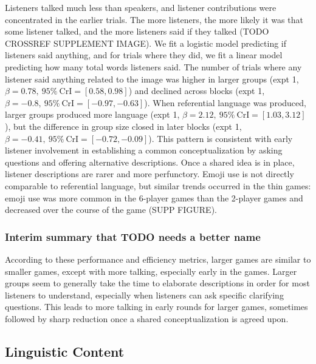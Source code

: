 \documentclass[
  english,
  a4paper,
]{article}
\begin{document}
Listeners talked much less than speakers, and listener contributions were concentrated in the earlier trials. The more listeners, the more likely it was that some listener talked, and the more listeners said if they talked (TODO CROSSREF SUPPLEMENT IMAGE). We fit a logistic model predicting if listeners said anything, and for trials where they did, we fit a linear model predicting how many total words listeners said. The number of trials where any listener said anything related to the image was higher in larger groups (expt 1, \(\beta=0.78,\:95\%\:\mathrm{CrI}=[0.58, 0.98]\)) and declined across blocks (expt 1, \(\beta=-0.8,\:95\%\:\mathrm{CrI}=[-0.97, -0.63]\)). When referential language was produced, larger groups produced more language (expt 1, \(\beta=2.12,\:95\%\:\mathrm{CrI}=[1.03, 3.12]\)), but the difference in group size closed in later blocks (expt 1, \(\beta=-0.41,\:95\%\:\mathrm{CrI}=[-0.72, -0.09]\)). This pattern is consistent with early listener involvement in establishing a common conceptualization by asking questions and offering alternative descriptions. Once a shared idea is in place, listener descriptions are rarer and more perfunctory. Emoji use is not directly comparable to referential language, but similar trends occurred in the thin games: emoji use was more common in the 6-player games than the 2-player games and decreased over the course of the game (SUPP FIGURE).

\hypertarget{interim-summary-that-todo-needs-a-better-name}{%
\subsubsection{Interim summary that TODO needs a better name}\label{interim-summary-that-todo-needs-a-better-name}}

According to these performance and efficiency metrics, larger games are similar to smaller games, except with more talking, especially early in the games. Larger groups seem to generally take the time to elaborate descriptions in order for most listeners to understand, especially when listeners can ask specific clarifying questions. This leads to more talking in early rounds for larger games, sometimes followed by sharp reduction once a shared conceptualization is agreed upon.

\hypertarget{linguistic-content}{%
\subsection{Linguistic Content}\label{linguistic-content}}
\end{document}
